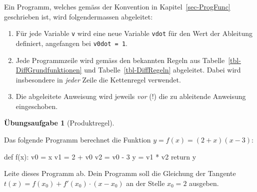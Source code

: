 \documentclass[
  letterpaper,
  DIV=11,
  oneside]{scrreprt}
\newenvironment{Shaded}{\begin{snugshade}}{\end{snugshade}}
\newcommand{\ControlFlowTok}[1]{\textcolor[rgb]{0.00,0.23,0.31}{#1}}
\newcommand{\DecValTok}[1]{\textcolor[rgb]{0.68,0.00,0.00}{#1}}
\newcommand{\KeywordTok}[1]{\textcolor[rgb]{0.00,0.23,0.31}{#1}}
\newcommand{\NormalTok}[1]{\textcolor[rgb]{0.00,0.23,0.31}{#1}}
\newcommand{\OperatorTok}[1]{\textcolor[rgb]{0.37,0.37,0.37}{#1}}
\providecommand{\tightlist}{%
  \setlength{\itemsep}{0pt}\setlength{\parskip}{0pt}}\usepackage{longtable,booktabs,array}
\theoremstyle{definition}
\newtheorem{exercise}{Übungsaufgabe}[chapter]
\theoremstyle{definition}
\theoremstyle{remark}
\begin{document}
\begin{tcolorbox}[enhanced jigsaw, colframe=quarto-callout-important-color-frame, colback=white, opacityback=0, toptitle=1mm, bottomrule=.15mm, breakable, title=\textcolor{quarto-callout-important-color}{\faExclamation}\hspace{0.5em}{Konvention}, toprule=.15mm, colbacktitle=quarto-callout-important-color!10!white, leftrule=.75mm, titlerule=0mm, coltitle=black, bottomtitle=1mm, arc=.35mm, rightrule=.15mm, left=2mm, opacitybacktitle=0.6]

Ein Programm, welches gemäss der Konvention in
Kapitel~\ref{sec-ProgFunc} geschrieben ist, wird folgendermassen
abgeleitet:

\begin{enumerate}
\def\labelenumi{\arabic{enumi}.}
\tightlist
\item
  Für jede Variable \texttt{v} wird eine neue Variable \texttt{vdot} für
  den Wert der Ableitung definiert, angefangen bei \texttt{v0dot\ =\ 1}.
\item
  Jede Programmzeile wird gemäss den bekannten Regeln aus
  Tabelle~\ref{tbl-DiffGrundfunktionen} und Tabelle~\ref{tbl-DiffRegeln}
  abgeleitet. Dabei wird insbesondere in \emph{jeder} Zeile die
  Kettenregel verwendet.
\item
  Die abgeleitete Anweisung wird jeweils \emph{vor} (!) die zu
  ableitende Anweisung eingeschoben.
\end{enumerate}

\end{tcolorbox}

\leavevmode{}%
\begin{exercise}[Produktregel]\label{exr-SADProduktregel}

Das folgende Programm berechnet die Funktion \(y = f(x) = (2+x)(x-3)\):

\begin{Shaded}
\begin{Highlighting}[]
\KeywordTok{def}\NormalTok{ f(x):}
\NormalTok{    v0 }\OperatorTok{=}\NormalTok{ x}
\NormalTok{    v1 }\OperatorTok{=} \DecValTok{2} \OperatorTok{+}\NormalTok{ v0}
\NormalTok{    v2 }\OperatorTok{=}\NormalTok{ v0 }\OperatorTok{{-}} \DecValTok{3}
\NormalTok{    y }\OperatorTok{=}\NormalTok{ v1 }\OperatorTok{*}\NormalTok{ v2}
    \ControlFlowTok{return}\NormalTok{ y}
\end{Highlighting}
\end{Shaded}

Leite dieses Programm ab. Dein Programm soll die Gleichung der Tangente
\(t(x) = f(x_0) + f'(x_0)\cdot (x-x_0)\) an der Stelle \(x_0 = 2\)
ausgeben.

\end{exercise}
\end{document}
